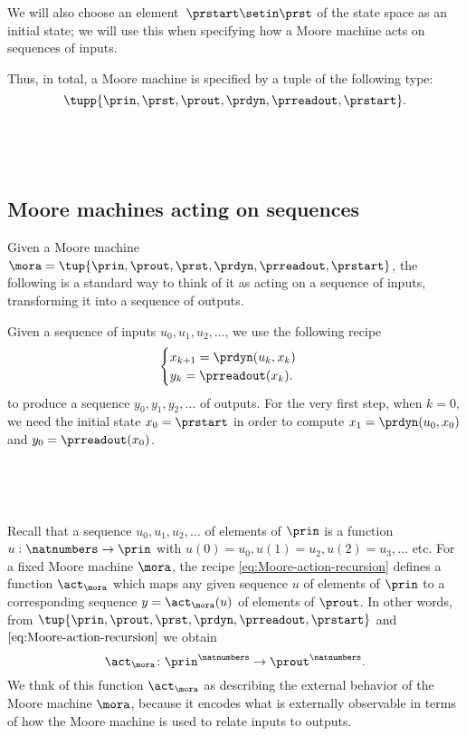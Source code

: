We will also choose an element~$\prstart \setin \prst$ of the state space as an initial state; we will use this when specifying how a Moore machine acts on sequences of inputs.

Thus, in total, a Moore machine is specified by a tuple of the following type:
\begin{equation}
    \label{eq:moore-tuple}
    \tupp{\prin,\prst,\prout,\prdyn,\prreadout,\prstart}.
\end{equation}

\


\

\subsection{Moore machines acting on sequences}

Given a Moore machine $\mora = \tup{\prin, \prout, \prst, \prdyn, \prreadout, \prstart}$, the following is a standard way to think of it as acting on a sequence of inputs, transforming it into a sequence of outputs.

Given a sequence of inputs $u_0, u_1, u_2, \dots $, we use the following recipe
\begin{equation}
    \label{eq:Moore-action-recursion}
    \begin{cases}
        x_{k+1} = \prdyn(u_k, x_k) \\
        y_{k}   = \prreadout(x_{k}).
    \end{cases}
\end{equation}
to produce a sequence $y_0, y_1, y_2, \dots $ of outputs.
For the very first step, when $k = 0$, we need the initial state $x_0 = \prstart$ in order to compute $x_1 = \prdyn(u_0, x_0)$ and $y_0 = \prreadout(x_0)$.

\


\

Recall that a sequence $u_0, u_1, u_2, \dots$ of elements of $\prin$ is a function $u : \natnumbers \to \prin$ with $u(0) = u_0, u(1) = u_2, u(2) = u_3, \dots$ etc. For a fixed Moore machine $\mora$, the recipe \cref{eq:Moore-action-recursion} defines a function $\act_\mora$ which maps any given sequence $u$ of elements of $\prin$ to a corresponding sequence $y = \act_\mora(u)$ of elements of $\prout$.
In other words, from $\tup{\prin, \prout, \prst, \prdyn, \prreadout, \prstart}$ and $\cref{eq:Moore-action-recursion}$ we obtain 
$$
\act_\mora \colon \prin^\natnumbers \to \prout^\natnumbers.
$$ 
We thnk of this function $\act_\mora$ as describing the external behavior of the Moore machine $\mora$, because it encodes what is externally observable in terms of how the Moore machine is used to relate inputs to outputs.

